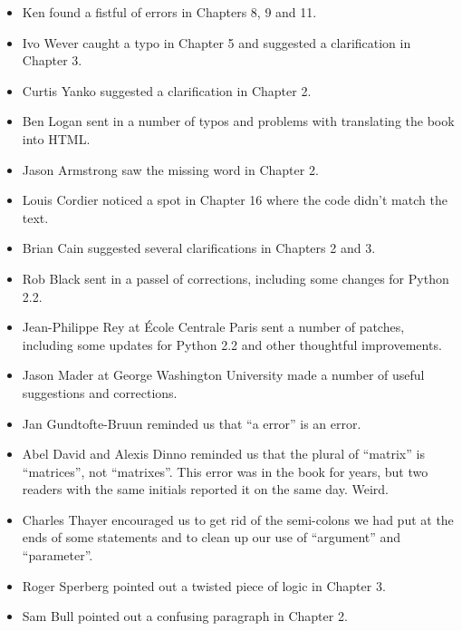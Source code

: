 \documentclass[10pt]{book}
\begin{document}
\begin{itemize}
\item Ken found a fistful of errors in Chapters 8, 9 and 11.

\item Ivo Wever caught a typo in Chapter 5 and suggested a clarification
in Chapter 3.

\item Curtis Yanko suggested a clarification in Chapter 2.

\item Ben Logan sent in a number of typos and problems with translating
the book into HTML.

\item Jason Armstrong saw the missing word in Chapter 2.

\item Louis Cordier noticed a spot in Chapter 16 where the code
didn't match the text.

\item Brian Cain suggested several clarifications in Chapters 2 and 3.

\item Rob Black sent in a passel of corrections, including some
changes for Python 2.2.

\item Jean-Philippe Rey at \'{E}cole Centrale
Paris sent a number of patches, including some updates for Python 2.2
and other thoughtful improvements.

\item Jason Mader at George Washington University made a number
of useful suggestions and corrections.

\item Jan Gundtofte-Bruun reminded us that ``a error'' is an error.

\item Abel David and Alexis Dinno reminded us that the plural of
``matrix'' is ``matrices'', not ``matrixes''.  This error was in the
book for years, but two readers with the same initials reported it on
the same day.  Weird.

\item Charles Thayer encouraged us to get rid of the semi-colons
we had put at the ends of some statements and to clean up our
use of ``argument'' and ``parameter''.

\item Roger Sperberg pointed out a twisted piece of logic in Chapter 3.

\item Sam Bull pointed out a confusing paragraph in Chapter 2.


\end{itemize}
\end{document}
